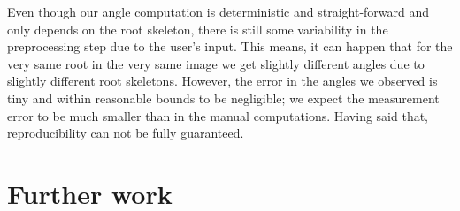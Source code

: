 Even though our angle computation is deterministic and straight-forward and only depends on the root skeleton, there is still some variability in the preprocessing step due to the user's input. This means, it can happen that for the very same root in the very same image we get slightly different angles due to slightly different root skeletons. %
However, the error in the angles we observed is tiny and within reasonable bounds to be negligible; we expect the measurement error to be much smaller than in the manual computations. Having said that, reproducibility can not be fully guaranteed. %


%
%








 
\section{Further work}

